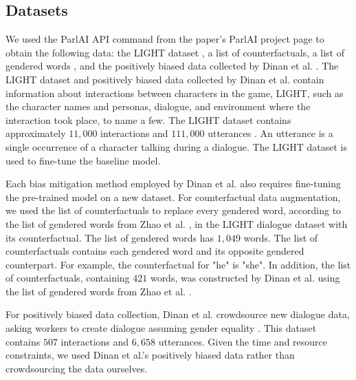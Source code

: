 \subsection{Datasets}
We used the ParlAI API command from the paper’s ParlAI project page \supercite{parlgenderation} to obtain the following data: the LIGHT dataset \supercite{urbanek2019}, a list of counterfactuals, a list of gendered words \supercite{zhao-etal-2018-learning}, and the positively biased data collected by Dinan et al. \supercite{dinan2020}. The LIGHT dataset and positively biased data collected by Dinan et al. contain information about interactions between characters in the game, LIGHT, such as the character names and personas, dialogue, and environment where the interaction took place, to name a few. The LIGHT dataset contains approximately $11,000$ interactions and $111,000$ utterances \supercite{urbanek2019}. An utterance is a single occurrence of a character talking during a dialogue. The LIGHT dataset is used to fine-tune the baseline model.

Each bias mitigation method employed by Dinan et al. \supercite{dinan2020} also requires fine-tuning the pre-trained model on a new dataset. For counterfactual data augmentation, we used the list of counterfactuals to replace every gendered word, according to the list of gendered words from Zhao et al. \supercite{zhao-etal-2018-learning}, in the LIGHT dialogue dataset with its counterfactual. The list of gendered words \supercite{zhao-etal-2018-learning} has $1,049$ words. The list of counterfactuals contains each gendered word and its opposite gendered counterpart. For example, the counterfactual for "he" is "she". In addition, the list of counterfactuals, containing $421$ words, was constructed by Dinan et al. \supercite{dinan2020} using the list of gendered words from Zhao et al. \supercite{zhao-etal-2018-learning}.

For positively biased data collection, Dinan et al. crowdsource new dialogue data, asking workers to create dialogue assuming gender equality \supercite{dinan2020}. This dataset contains $507$ interactions and $6,658$ utterances. Given the time and resource constraints, we used Dinan et al.’s positively biased data \supercite{dinan2020} rather than crowdsourcing the data ourselves.

